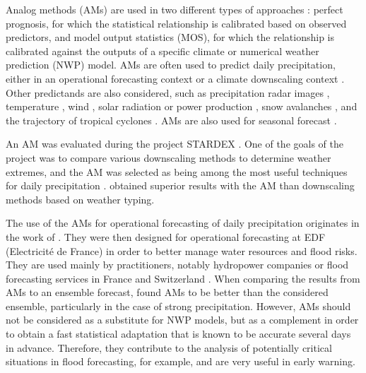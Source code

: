 \documentclass[gmdd]{copernicus}
\begin{document}
Analog methods (AMs) are used in two different types of approaches \citep{Rummukainen1997}: perfect prognosis, for which the statistical relationship is calibrated based on observed predictors, and model output statistics (MOS), for which the relationship is calibrated against the outputs of a specific climate or numerical weather prediction (NWP) model. AMs are often used to predict daily precipitation, either in an operational forecasting context \citep[e.g.][]{Guilbaud1997, Bontron2005, Hamill2006, Bliefernicht2010, Marty2012, Horton2012, Hamill2015, BenDaoud2016} or a climate downscaling context \citep[e.g.][]{Zorita1999, Wetterhall2005, Wetterhall2007, Matulla2007, Radanovics2013, Chardon2014, Dayon2015, Raynaud2016b}. Other predictands are also considered, such as precipitation radar images \citep{Panziera2011,Foresti2015a}, temperature \citep{Radinovic1975, Woodcock1980, Kruizinga1983, DelleMonache2013, Caillouet2016, Raynaud2016b}, wind \citep{Gordon1987, DelleMonache2013, DelleMonache2011, Vanvyve2015, Alessandrini2015, Junk2015, Junk2015c}, solar radiation or power production \citep{Alessandrini2015a, Bessa2015, Raynaud2016b}, snow avalanches \citep{Obled1980, Bolognesi1993}, and the trajectory of tropical cyclones \citep{Keenan1981, Sievers2000, Fraedrich2003}. AMs are also used for seasonal forecast \citep{Barnston1994, Xavier2007, Charles2012, Wu2012, Shao2013}.

An AM was evaluated during the project STARDEX \citep[\textit{STAtistical and Regional dynamical Downscaling of EXtremes for European regions}, see][]{Goodess2003, Stardex2005}. One of the goals of the project was to compare various downscaling methods to determine weather extremes, and the AM was selected as being among the most useful techniques for daily precipitation \citep{Maheras2005, Schmidli2007}. \citet{Bliefernicht2010} obtained superior results with the AM than downscaling methods based on weather typing.

The use of the AMs for operational forecasting of daily precipitation originates in the work of \citet{Duband1970, Duband1974, Duband1981}. They were then designed for operational forecasting at EDF (Electricit\'{e} de France) in order to better manage water resources and flood risks. They are used mainly by practitioners, notably hydropower companies \citep{Desaint2008a, BenDaoud2009, Obled2014} or flood forecasting services in France and Switzerland \citep{Marty2010, GarciaHernandez2009b, Horton2012}. When comparing the results from AMs to an ensemble forecast, \citet{Marty2010} found AMs to be better than the considered ensemble, particularly in the case of strong precipitation. However, AMs should not be considered as a substitute for NWP models, but as a complement in order to obtain a fast statistical adaptation that is known to be accurate several days in advance. Therefore, they contribute to the analysis of potentially critical situations in flood forecasting, for example, and are very useful in early warning.
\end{document}
